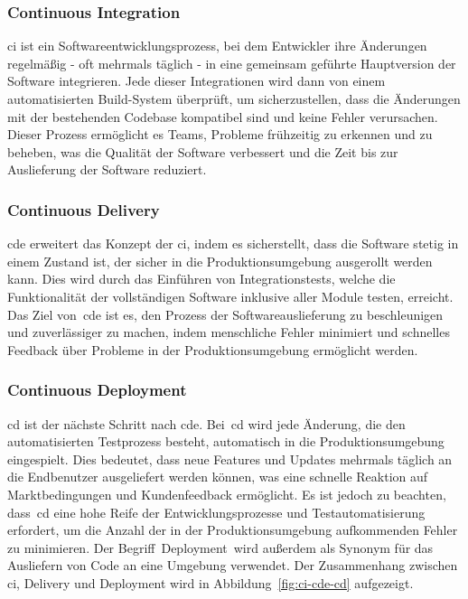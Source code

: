 \subsubsection{Continuous Integration}

\acrfull{ci} ist ein Softwareentwicklungsprozess, bei dem Entwickler ihre Änderungen
regelmäßig - oft mehrmals täglich - in eine gemeinsam geführte Hauptversion der Software integrieren.
Jede dieser Integrationen wird dann von einem automatisierten Build-System überprüft, um sicherzustellen, dass die
Änderungen mit der bestehenden Codebase kompatibel sind und keine Fehler verursachen.
Dieser Prozess ermöglicht es Teams, Probleme frühzeitig zu erkennen und zu beheben, was die Qualität der Software
verbessert und die Zeit bis zur Auslieferung der Software reduziert.

\subsubsection{Continuous Delivery}

\acrfull{cde} erweitert das Konzept der \acrlong{ci}, indem es sicherstellt, dass die
Software stetig in einem Zustand ist, der sicher in die Produktionsumgebung ausgerollt werden kann.
Dies wird durch das Einführen von Integrationstests, welche die Funktionalität der vollständigen Software inklusive
aller Module testen, erreicht.
Das Ziel von\ \acrshort{cde} ist es, den Prozess der Softwareauslieferung zu beschleunigen und zuverlässiger zu machen,
indem menschliche Fehler minimiert und schnelles Feedback über Probleme in der Produktionsumgebung ermöglicht werden.

\subsubsection{Continuous Deployment}

\acrfull{cd} ist der nächste Schritt nach \acrlong{cde}.
Bei\ \acrshort{cd} wird jede Änderung, die den automatisierten Testprozess besteht, automatisch in die
Produktionsumgebung eingespielt.
Dies bedeutet, dass neue Features und Updates mehrmals täglich an die Endbenutzer ausgeliefert werden können, was eine
schnelle Reaktion auf Marktbedingungen und Kundenfeedback ermöglicht.
Es ist jedoch zu beachten, dass\ \acrshort{cd} eine hohe Reife der Entwicklungsprozesse und Testautomatisierung
erfordert, um die Anzahl der in der Produktionsumgebung aufkommenden Fehler zu minimieren.
Der Begriff\ \glqq Deployment\grqq\ wird außerdem als Synonym für das Ausliefern von Code an eine Umgebung verwendet.
Der Zusammenhang zwischen \acrlong{ci}, Delivery und Deployment wird in Abbildung\ \ref{fig:ci-cde-cd}
aufgezeigt.

